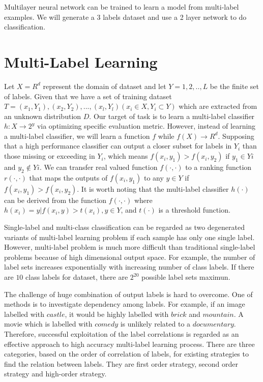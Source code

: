 Multilayer neural network can be trained to learn a model from multi-label examples. We will generate a 3 labels dataset and use a 2 layer network to do classification.

\section{Multi-Label Learning}
Let $X = R^d$ represent the domain of dataset and let $Y = {1,2,..,L}$ be the finite set of labels. Given that we have a set of training dataset $T = {(x_{1},Y_{1}),(x_{2},Y_{2}),...,(x_{l},Y_{l})} (x_{i} \in X, Y_{i} \subset Y)$ which are extracted from an unknown distribution $D$. Our target of task is to learn a multi-label classifier $h: X \to 2^y $ via optimizing specific evaluation metric. However, instead of learning a multi-label classifier, we will learn a function $f$ while $f(X) \to R^d$. Supposing that a high performance classifier can output a closer subset for labels in $Y_{i}$ than those missing or exceeding in $Y_{i}$, which means $f(x_{i}, y_{1}) > f(x_{i}, y_{2})$ if $y_{1} \in Y{i}$ and $y_{2} \notin Y{i}$. We can transfer real valued function $f(\cdot , \cdot)$ to a ranking function $r(\cdot , \cdot)$ that maps the outputs of $f(x_{i}, y_{1})$ to any $y \in Y$ if $f(x_{i}, y_{1}) > f(x_{i}, y_{2})$. It is worth noting that the multi-label classifier $h(\cdot)$ can be derived from the function $f(\cdot , \cdot)$ where $h(x_{i}) = {y|f(x_{i}, y) > t(x_{i}), y \in Y}$, and $t(\cdot)$ is a threshold function.

Single-label and multi-class classification can be regarded as two degenerated variants of multi-label learning problem if each sample has only one single label. However, multi-label problem is much more difficult than traditional single-label problems because of high dimensional output space. For example, the number of label sets increases exponentially with increasing number of class labels. If there are $10$ class labels for dataset, there are $2^20$ possible label sets maximun.

The challenge of huge combination of output labels is hard to overcome. One of methods is to investigate dependency among labels. For example, if an image labelled with $castle$, it would be highly labelled with $brick$ and $mountain$. A movie which is labelled with $comedy$ is unlikely related to a $documentary$. Therefore, successful exploitation of the label correlations is regarded as an effective approach to high accuracy multi-label learning process. There are three categories, based on the order of correlation of labels, for existing strategies to find the relation between labels. They are first order strategy, second order strategy and high-order strategy. 

